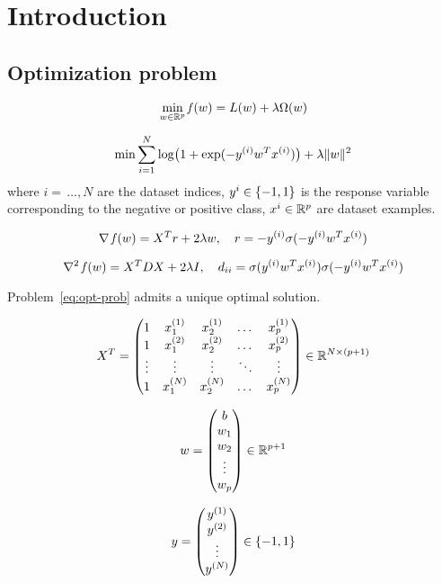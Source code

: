 \section{Introduction}\label{sc:intro}


\subsection{Optimization problem}

\[
\min_{w\in\mathbb{R}^p}\operatorname*{\mathit{f}}(w)=L(w)+\lambda\Omega(w)
\]

\begin{equation}\label{eq:opt-prob}
\min\sum_{i=1}^N\log\bigl(1+\exp(-y^{(i)}w^Tx^{(i)})\bigr)+\lambda\lVert w\rVert^2
\end{equation}
where $i=\,\dots,N$ are the dataset indices, $y^{i}\in\{-1,1\}$ is the response variable corresponding to the negative or positive class, $x^{i}\in\mathbb{R}^p$ are dataset examples.

\[
\nabla\operatorname*{\mathit{f}}(w)=X^Tr+2\lambda w,\quad r=-y^{(i)}\sigma(-y^{(i)}w^Tx^{(i)})
\]

\[
\nabla^2\operatorname*{\mathit{f}}(w)=X^TDX+2\lambda I,\quad d_{ii}=\sigma(y^{(i)}w^Tx^{(i)})\sigma(-y^{(i)}w^Tx^{(i)})
\]

\begin{prop}
Problem~\eqref{eq:opt-prob} admits a unique optimal solution.
\end{prop}

\[
X^T=
\begin{pmatrix}
1 & x_1^{(1)} & x_2^{(1)} & \dots & x_p^{(1)} \\
1 & x_1^{(2)} & x_2^{(2)} & \dots & x_p^{(2)} \\
\vdots & \vdots & \vdots & \ddots & \vdots \\
1 & x_1^{(N)} & x_2^{(N)} & \dots & x_p^{(N)}
\end{pmatrix}\in\mathbb{R}^{N\times(p+1)}
\]

\[
w=
\begin{pmatrix}
b \\ w_1 \\ w_2 \\ \vdots \\ w_p
\end{pmatrix}\in\mathbb{R}^{p+1}
\]

\[
y=
\begin{pmatrix}
y^{(1)} \\ y^{(2)} \\ \vdots \\ y^{(N)}
\end{pmatrix}\in\{-1,1\}
\]

